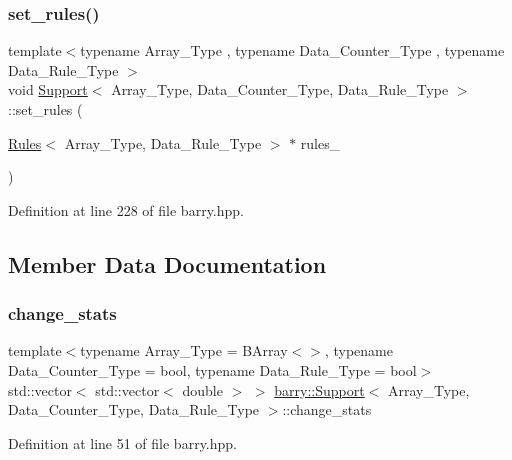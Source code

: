 \subsubsection{\texorpdfstring{set\+\_\+rules()}{set\_rules()}}
{\footnotesize\ttfamily template$<$typename Array\+\_\+\+Type , typename Data\+\_\+\+Counter\+\_\+\+Type , typename Data\+\_\+\+Rule\+\_\+\+Type $>$ \\
void \hyperlink{classbarry_1_1_support}{Support}$<$ Array\+\_\+\+Type, Data\+\_\+\+Counter\+\_\+\+Type, Data\+\_\+\+Rule\+\_\+\+Type $>$\+::set\+\_\+rules (\begin{DoxyParamCaption}\item[{\hyperlink{classbarry_1_1_rules}{Rules}$<$ Array\+\_\+\+Type, Data\+\_\+\+Rule\+\_\+\+Type $>$ $\ast$}]{rules\+\_\+ }\end{DoxyParamCaption})\hspace{0.3cm}{\ttfamily [inline]}}



Definition at line 228 of file barry.\+hpp.



\subsection{Member Data Documentation}
\mbox{\label{classbarry_1_1_support_a37c139514065d10807cd574ca748744b}} 
\subsubsection{\texorpdfstring{change\+\_\+stats}{change\_stats}}
{\footnotesize\ttfamily template$<$typename Array\+\_\+\+Type  = B\+Array$<$$>$, typename Data\+\_\+\+Counter\+\_\+\+Type  = bool, typename Data\+\_\+\+Rule\+\_\+\+Type  = bool$>$ \\
std\+::vector$<$ std\+::vector$<$ double $>$ $>$ \hyperlink{classbarry_1_1_support}{barry\+::\+Support}$<$ Array\+\_\+\+Type, Data\+\_\+\+Counter\+\_\+\+Type, Data\+\_\+\+Rule\+\_\+\+Type $>$\+::change\+\_\+stats}



Definition at line 51 of file barry.\+hpp.

\mbox{\label{classbarry_1_1_support_aa235837435a5ed7ac540481676333b88}} 
